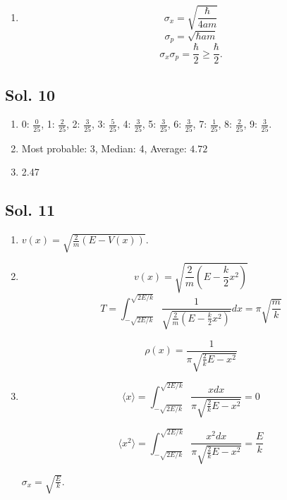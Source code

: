 \begin{enumerate}
    \begin{align*}
        \langle
         p
         \rangle
         = &
         -i\hbar
         \int 
         Ae^{-a[(mx^2/\hbar - it)]}
         \frac{\partial}{\partial x}
         Ae^{-a[(mx^2/\hbar + it)]} dx\\
         = & -i\hbar A\left(-\frac{2Aam}{\hbar}\right)
         \int xe^{-2a[(mx^2/\hbar)]}dx = 0
    \end{align*}
    \begin{align*}
        \langle
         p^2
         \rangle
         = &
         -\hbar^2
         \int 
         Ae^{-a[(mx^2/\hbar - it)]}
         \frac{\partial^2}{\partial x^2}
         Ae^{-a[(mx^2/\hbar + it)]} dx\\
         = & -\hbar^2 A\left(\frac{2Aam}{\hbar^2}\right)
         \int (2amx^2-\hbar)e^{-2a[(mx^2/\hbar)]}dx\\
         =& 2A^2am\sqrt{\frac{\pi\hbar^3}{8am}}\\
         =&\hbar am
    \end{align*}
    \item 
    $$
    \sigma_x = \sqrt{\frac{\hbar}{4am}}
    $$
    $$
    \sigma_p = \sqrt{\hbar am}
    $$
    $$
    \sigma_x\sigma_p = \frac{\hbar}{2} \geq \frac{\hbar}{2}.
    $$
\end{enumerate}


\subsection*{Sol. 10}
\begin{enumerate}
    \item 
    0: $\frac{0}{25}$, 1: $\frac{2}{25}$,
    2: $\frac{3}{25}$, 3: $\frac{5}{25}$,
    4: $\frac{3}{25}$, 5: $\frac{3}{25}$,
    6: $\frac{3}{25}$, 7: $\frac{1}{25}$,
    8: $\frac{2}{25}$, 9: $\frac{3}{25}$.
    \item Most probable: 3, Median: 4, Average: $4.72$
    \item 2.47
\end{enumerate}
\subsection*{Sol. 11}
\begin{enumerate}
    \item $v(x)=\sqrt{\frac{2}{m}(E-V(x))}$.
    \item $$
    v(x) = \sqrt{\frac{2}{m}(E-\frac{k}{2}x^2)}
    $$
    $$
    T = \int_{-\sqrt{2E/k}}^{\sqrt{2E/k}}
    \frac{1}{\sqrt{\frac{2}{m}(E-\frac{k}{2}x^2)}}dx
    = \pi\sqrt{\frac{m}{k}}
    $$

    $$
    \rho(x) = 
    \frac{1}{ \pi\sqrt{\frac{2}{k}E-x^2}}
    $$
    \item 

    $$
    \langle
    x\rangle
    =\int_{-\sqrt{2E/k}}^{\sqrt{2E/k}}
    \frac{xdx}{ \pi\sqrt{\frac{2}{k}E-x^2}} = 0
    $$

    $$
    \langle
    x^2\rangle
    =\int_{-\sqrt{2E/k}}^{\sqrt{2E/k}}
    \frac{x^2dx}{ \pi\sqrt{\frac{2}{k}E-x^2}} = \frac{E}{k}
    $$

    $\sigma_x=\sqrt{\frac{E}{k}}$.
\end{enumerate}


